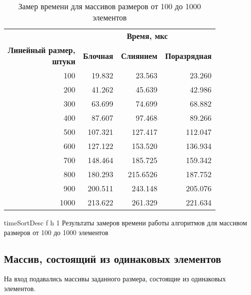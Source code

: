 \begin{table}[ht]
	\small
	\begin{center}
		\begin{threeparttable}
			\caption{Замер времени для массивов размеров от 100 до 1000 элементов}
			\label{tbl:timeDesc}
			\begin{tabular}{|r|r|r|r|}
				\hline
				& \multicolumn{3}{c|}{\bfseries Время, мкс} \\ \cline{2-4}
				\bfseries \makecell{Линейный размер, \\ штуки} & \bfseries Блочная & \bfseries Слиянием & \bfseries Поразрядная \\ \cline{2-4}
				\hline
				100 & 19.832 & 23.563 & 23.260 \\
				\hline
				200 & 41.262 & 45.639 & 42.986 \\
				\hline
				300 & 63.699 & 74.699 & 68.882 \\
				\hline
				400 & 87.607 & 97.468 & 89.266 \\
				\hline
				500 & 107.321 & 127.417 & 112.047 \\
				\hline
				600 & 127.122 & 153.520 & 136.934 \\
				\hline
				700 & 148.464 & 185.725 & 159.342 \\
				\hline
				800 & 180.293 & 215.6526 & 187.752 \\
				\hline
				900 & 200.511 & 243.148 & 205.076 \\
				\hline
				1000 & 213.622 & 261.329 & 221.634 \\
				\hline
			\end{tabular}	
		\end{threeparttable}
	\end{center}
\end{table}

{timeSortDesc} %
{f} %
{h} %
{1\textwidth} %
{Результаты замеров времени работы алгоритмов для массивом размеров от 100 до 1000 элементов} %

\clearpage

\subsection{Массив, состоящий из одинаковых элементов}

На вход подавались массивы заданного размера, состоящие из одинаковых элементов.

